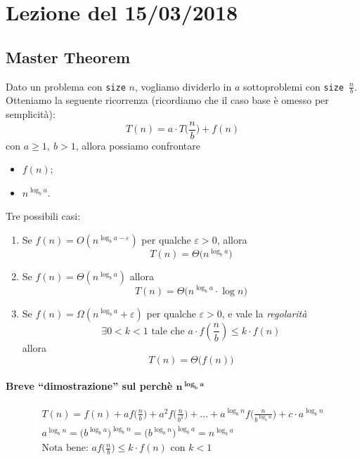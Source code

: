 \section{Lezione del 15/03/2018}

\subsection{Master Theorem} \label{mastertheorem}
Dato un problema con \texttt{size} $n$, vogliamo dividerlo in $a$ sottoproblemi 
con \mbox {\texttt{size} $\frac{n}{b}$}. Otteniamo la seguente ricorrenza (ricordiamo che
il caso base è omesso per semplicità):
\[
    T(n) = a \cdot T\Big(\frac{n}{b}\Big) + f(n)
\]
con $a \geq 1, \ b > 1$, allora possiamo confrontare
\begin{itemize}
    \item $f(n)$;
    \item $n^{\log_b a}$.
\end{itemize}
Tre possibili casi:
\begin{enumerate}
    \item Se $f(n) = O(n^{\log_b a - \varepsilon})$ per qualche $\varepsilon > 0$,
    allora $$T(n) = \Theta \big( n^{\log_b a} \big)$$
    
    \item Se $f(n) = \Theta (n^{\log_b a})$ allora 
    $$T(n) = \Theta \big( n^{\log_b a} \cdot \log n \big)$$
    
    \item Se $f(n) = \Omega (n^{\log_b a} + \varepsilon)$ per qualche $\varepsilon > 0$,
    e vale la \emph{regolarità}
    $$ \exists 0 < k < 1 \text{ tale che } a \cdot f(\frac{n}{b}) \leq k \cdot f(n)$$
    allora
    $$ T(n) = \Theta \big( f(n) \big) $$ 
\end{enumerate}

\paragraph{Breve ``dimostrazione'' sul perchè $\boldsymbol{n^{\log_b a}}$} 
\begin{gather*}
    T(n) = f(n) + af\Big(\frac{n}{b}\Big) + a^2f\Big(\frac{n}{b^2}\Big) + \dots + a^{\log_b n}f\Big(\frac{n}{b^{\log_b n}}\Big) + c \cdot a^{\log_b n} \\
    a^{\log_b n} = \big(b^{\log_b a}\big)^{\log_b n} = \big(b^{\log_b n}\big)^{\log_b a} = n^{\log_b a} \\
    \text{Nota bene: } af\Big(\frac{n}{b}\Big) \leq k \cdot f(n) \text{ con } k < 1
\end{gather*}

